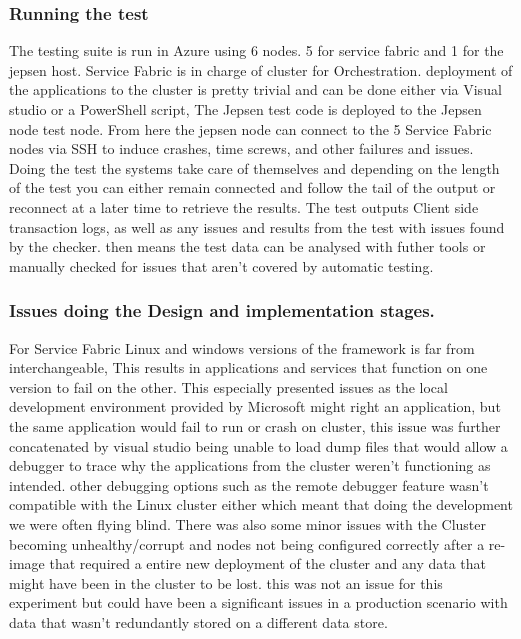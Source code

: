 \documentclass[a4paper,10pt,titlepage]{report}
\begin{document}
\subsubsection{Running the test}

The testing suite is run in Azure using 6 nodes. 5 for service fabric and 1 for the jepsen host. Service Fabric is in charge of cluster for Orchestration. deployment of the applications to the cluster is pretty trivial and can be done either via Visual studio or a PowerShell script, The Jepsen test code is deployed to the Jepsen node test node. From here the jepsen node can connect to the 5 Service Fabric nodes via SSH to induce crashes, time screws, and other failures and issues.  Doing the test the systems take care of themselves and depending on the length of the test you can either remain connected and follow the tail of the output or reconnect at a later time to retrieve the results. The test outputs Client side transaction logs, as well as any issues and results from the test with issues found by the checker. then means the test data can be analysed with futher tools or manually checked for issues that aren't covered by automatic testing.


\subsubsection{Issues doing the Design and implementation stages.}

For Service Fabric Linux and windows versions of the framework is far from interchangeable, This results in applications and services that function on one version to fail on the other. This especially presented issues as the local development environment provided by Microsoft might right an application, but the same application would fail to run or crash on cluster, this issue was further concatenated by visual studio being unable to load dump files that would allow a debugger to trace why the applications from the cluster weren't functioning as intended. other debugging options such as the remote debugger feature wasn't compatible with the Linux cluster either which meant that doing the development we were often flying blind. There was also some minor issues with the Cluster becoming unhealthy/corrupt and nodes not being configured correctly after a re-image that required a entire new deployment of the cluster and any data that might have been in the cluster to be lost. this was not an issue for this experiment but could have been a significant issues in a production scenario with data that wasn't redundantly stored on a different data store.
\end{document}
